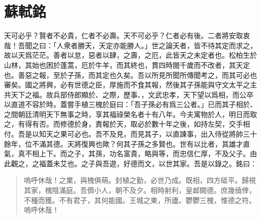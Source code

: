 \theendnotes

\section[三槐堂銘\quad{\small 蘇軾}]{{\normalsize 蘇軾}\quad {}銘}
天可必乎？賢者不必貴，仁者不必壽。天不可必乎？仁者必有後。二者將安取衷哉！吾聞之曰：「人{衆}者勝天，天定亦能勝人。」世之論天者，皆不待其定而求之，故以天爲茫茫。善者以怠，惡者以肆，之壽，之厄，此皆天之未定者也。松柏生於山林，其始也困於蓬蒿，厄於牛羊，而其終也，貫四時閱千歲而不改者，其天定也。善惡之報，至於子孫，而其定也久矣。吾以所見所聞所傳聞考之，而其可必也審矣。國之將興，必有世德之臣，厚施而不食其報，然後其子孫能與守文太平之主共天下之福。故兵部侍郎顯於、之際，歷事、，文武忠孝，天下望以爲相，而公卒以直道不容於時。蓋嘗手植三槐於庭曰：「吾子孫必有爲三公者。」已而其子相於、之間朝廷清明天下無事之時，享其福祿榮名者十有八年。今夫寓物於人，明日而取之，有得有否。而修德於身，責報於天，取必於數十年之後，如持左契，交手相付。吾是以知天之果可必也。吾不及見，而見其子，以直諫事，出入侍從將帥三十餘年，位不滿其德。天將復興也歟？何其子孫之多賢也。世有以比者，其雄才直氣，真不相上下。而之子，其孫，功名富貴，略與等，而忠{信}仁厚，不及父子。由此觀之，之福蓋未艾也。之子與吾遊，好德而文，以世其家。吾是以錄之。銘曰：%

\begin{quote}
    嗚呼休哉！之業，與槐俱萌。封植之勤，必世乃成。既相，四方砥平。歸視其家，槐陰滿庭。吾儕小人，朝不及夕。相時射利，皇䘏闕德。庶幾僥倖，不種而獲。不有君子，其何能國。王城之東，所廬。鬱鬱三槐，惟德之符。嗚呼休哉！
\end{quote}

